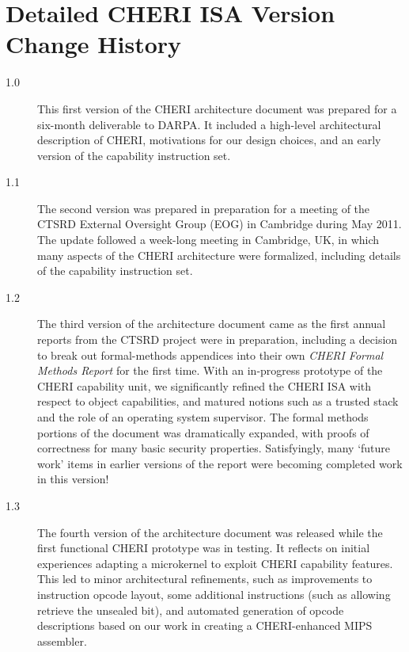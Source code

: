 \section{Detailed CHERI ISA Version Change History}
\label{sec:detailed-cheri-isa-version-change-history}

\begin{description}
\item[1.0] This first version of the CHERI architecture document was prepared
  for a six-month deliverable to DARPA.
  It included a high-level architectural description of CHERI, motivations
  for our design choices, and an early version of the capability instruction
  set.

\item[1.1] The second version was prepared in preparation for a meeting of the
  CTSRD External Oversight Group (EOG) in Cambridge during May 2011.
  The update followed a week-long meeting in Cambridge, UK, in which many
  aspects of the CHERI architecture were formalized, including
  details of the capability instruction set.

\item[1.2] The third version of the architecture document came as the first
  annual reports from the CTSRD project were in preparation, including a
  decision to break out formal-methods appendices into their own {\em CHERI
  Formal Methods Report} for the first time.
  With an in-progress prototype of the CHERI capability unit, we
  significantly refined the CHERI ISA with respect to object capabilities, and
  matured notions such as a trusted stack and the role of an
  operating system supervisor.
  The formal methods portions of the document was dramatically
  expanded, with proofs of correctness for many basic security properties.
  Satisfyingly, many `future work' items in earlier versions of the report
  were becoming completed work in this version!

\item[1.3] The fourth version of the architecture document was released
  while
  the first functional CHERI prototype was in testing.  It reflects on
  initial experiences adapting a microkernel to exploit CHERI capability
  features.
  This led to minor architectural refinements, such as improvements to
  instruction opcode layout, some additional instructions (such as allowing
   retrieve the unsealed bit), and automated
  generation of opcode descriptions based on our work in creating a
  CHERI-enhanced MIPS assembler.


\end{description}
